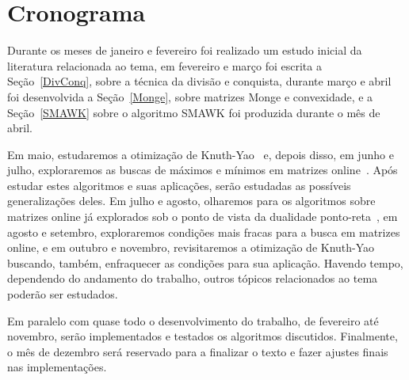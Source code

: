 \section{Cronograma}
Durante os meses de janeiro e fevereiro foi realizado um estudo inicial da literatura relacionada ao tema, em fevereiro e março foi escrita a Seção~\ref{DivConq}, sobre a técnica da divisão e conquista, durante março e abril foi desenvolvida a Seção~\ref{Monge}, sobre matrizes Monge e convexidade, e a Seção~\ref{SMAWK} sobre o algoritmo SMAWK foi produzida durante o mês de abril.  

Em maio, estudaremos a otimização de Knuth-Yao~\cite{Bein:2009,Knuth:1971,Yao:1980} e, depois disso, em junho e julho, exploraremos as buscas de máximos e mínimos em matrizes online~\cite{Galil:1992,Brucker:1995}. Após estudar estes algoritmos e suas aplicações, serão estudadas as possíveis generalizações deles. Em julho e agosto, olharemos para os algoritmos sobre matrizes online já explorados sob o ponto de vista da dualidade ponto-reta~\cite{Berg:2000}, em agosto e setembro, exploraremos condições mais fracas para a busca em matrizes online, e em outubro e novembro, revisitaremos a otimização de Knuth-Yao buscando, também, enfraquecer as condições para sua aplicação. Havendo tempo, dependendo do andamento do trabalho, outros tópicos relacionados ao tema poderão ser estudados. 

Em paralelo com quase todo o desenvolvimento do trabalho, de fevereiro até novembro, serão implementados e testados os algoritmos discutidos. Finalmente, o mês de dezembro será reservado para a finalizar o texto e fazer ajustes finais nas implementações. 



